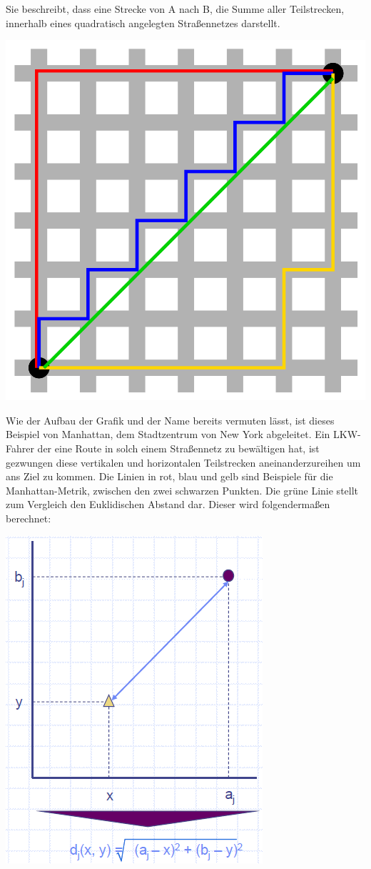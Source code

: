 \documentclass[a4paper,12pt]{scrreprt}
\begin{document}
	Sie beschreibt, dass eine Strecke von A nach B, die Summe aller Teilstrecken, innerhalb eines quadratisch angelegten Straßennetzes darstellt. 
	
	\begin{center}
	\includegraphics[width=0.5\linewidth]{./Bilder/manhattan}
	\end{center}
	
	Wie der Aufbau der Grafik und der Name bereits vermuten lässt, ist dieses Beispiel von Manhattan, dem Stadtzentrum von New York abgeleitet. Ein LKW-Fahrer der eine Route in solch einem Straßennetz zu bewältigen hat, ist gezwungen diese vertikalen und horizontalen Teilstrecken aneinanderzureihen um ans Ziel zu kommen. Die Linien in rot, blau und gelb sind Beispiele für die Manhattan-Metrik, zwischen den zwei schwarzen Punkten. Die grüne Linie stellt zum Vergleich den Euklidischen Abstand dar. Dieser wird folgendermaßen berechnet:\\
	
	\begin{center}
	\includegraphics[width=0.5\linewidth]{./Bilder/euklidisch}
	\end{center}
\end{document}
